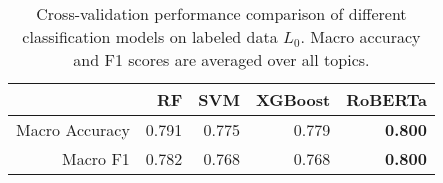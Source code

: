 

\begin{table}[!tbp]
        \fontsize{9pt}{10pt}\selectfont
        \begin{tabular}{rrrrr}
        \toprule
                & RF & SVM & XGBoost & RoBERTa \\
        \midrule
        Macro Accuracy & 0.791 & 0.775 & 0.779   & \textbf{0.800}   \\
        Macro F1       & 0.782 & 0.768 & 0.768   & \textbf{0.800}   \\
        \bottomrule
        \end{tabular}
    \caption{Cross-validation performance comparison of different classification models on labeled data $L_0$. Macro accuracy and F1 scores are averaged over all topics.}\label{tab:classifiers}
\end{table}